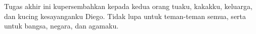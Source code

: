\vspace{7cm}

\begin{center}
	Tugas akhir ini kupersembahkan kepada kedua orang tuaku, kakakku, keluarga, dan kucing kesayanganku Diego. 
	Tidak lupa untuk teman-teman semua, serta untuk bangsa, negara, dan agamaku.
\end{center}

